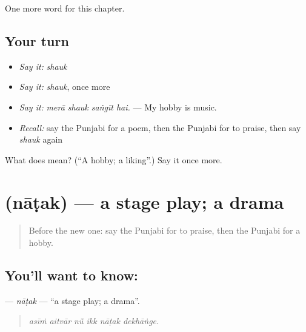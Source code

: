 \begin{grammarlens}[title={What you've built}]
One more word for this chapter.
\end{grammarlens}

\subsection*{Your turn}
\begin{itemize}
\raggedright
  \item \emph{Say it:} \emph{shauk}
  \item \emph{Say it:} \emph{shauk}, once more
  \item \emph{Say it:} \emph{merā shauk saṅgīt hai.} — My hobby is music.
  \item \emph{Recall:} say the Punjabi for a poem, then the Punjabi for to praise, then say \emph{shauk} again
\end{itemize}

\begin{tcolorbox}[breakable,colback=teal!4,colframe=teal!35!black,title={Before you move on}]
What does  mean? (\textquotedblleft{}A hobby; a liking\textquotedblright{}.) Say it once more.
\end{tcolorbox}
\section[\texorpdfstring{\pa{ਨਾਟਕ} (nāṭak)}{ਨਾਟਕ (nāṭak)}]{ (nāṭak) — a stage play; a drama}

\label{lesson:PA-C350-natak}



\begin{quote}
Before the new one: say the Punjabi for to praise, then the Punjabi for a hobby.
\end{quote}

\subsection*{You'll want to know: }
\textbf{} — \emph{nāṭak} — \textquotedblleft{}a stage play; a drama\textquotedblright{}.

\begin{quote}
     
\end{quote}

\begin{quote}
\emph{asīṁ aitvār nū̃ ikk nāṭak dekhāṅge.}
\end{quote}

